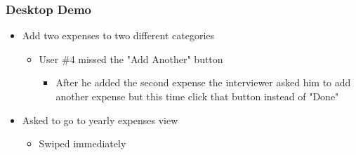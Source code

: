 \documentclass{chi2011}
\begin{document}
	\subsubsection{Desktop Demo}
	\begin{itemize}[noitemsep] 
		\item Add two expenses to two different categories
		\begin{itemize}[noitemsep]
			\item User \#4 missed the "Add Another" button
			\begin{itemize}[noitemsep]
				\item After he added the second expense the interviewer asked him to add another expense 
					  but this time click that button instead of "Done"
			\end{itemize}
		\end{itemize}
	\item Asked to go to yearly expenses view
		\begin{itemize}[noitemsep]
			\item Swiped immediately
		\end{itemize}
	\end{itemize}
\end{document}
